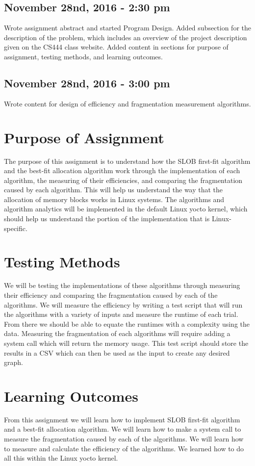 \documentclass[letterpaper,10pt]{article}
\begin{document}
\subsection{November 28nd, 2016 - 2:30 pm}
Wrote assignment abstract and started Program Design.
Added subsection for the description of the problem, which includes an overview of the project 
description given on the CS444 class website.
Added content in sections for purpose of assignment, testing methods, and learning outcomes.

\subsection{November 28nd, 2016 - 3:00 pm}
Wrote content for design of efficiency and fragmentation measurement algorithms.

\section{Purpose of Assignment}
The purpose of this assignment is to understand how the SLOB first-fit algorithm and the best-fit 
allocation algorithm work through the implementation of each algorithm, the measuring of their 
efficiencies, and comparing the fragmentation caused by each algorithm. This will help us understand
 the way that the allocation of memory blocks works in Linux systems. The algorithms and algorithm 
analytics will be implemented in the default Linux yocto kernel, which should help us understand the
 portion of the implementation that is Linux-specific.

\section{Testing Methods}
We will be testing the implementations of these algorithms through measuring their efficiency and 
comparing the fragmentation caused by each of the algorithms. We will measure the efficiency by 
writing a test script that will run the algorithms with a variety of inputs and measure the runtime 
of each trial. From there we should be able to equate the runtimes with a complexity using the data.
 Measuring the fragmentation of each algorithms will require adding a system call which will return 
 the memory usage. This test script should store the results in a CSV which can then be used as the 
 input to create any desired graph.

\section{Learning Outcomes}
From this assignment we will learn how to implement SLOB first-fit algorithm and a best-fit 
allocation algorithm. We will learn how to make a system call to measure the fragmentation caused by each of the algorithms. We will learn how to measure and calculate the efficiency of the 
algorithms. We learned how to do all this within the Linux yocto kernel.
\end{document}
